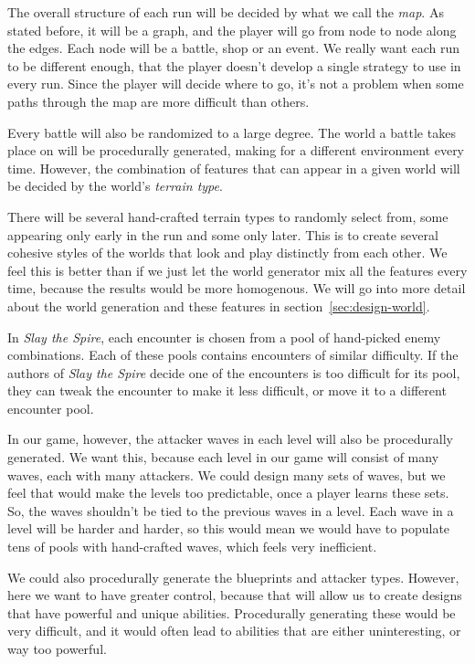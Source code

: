 \begin{notindemo}
    The overall structure of each run will be decided by what we call the \emph{map}.
    As stated before, it will be a graph, and the player will go from node to node along the edges.
    Each node will be a battle, shop or an event.
    We really want each run to be different enough, that the player doesn't develop a single strategy to use in every run.
    Since the player will decide where to go, it's not a problem when some paths through the map are more difficult than others.
\end{notindemo}

Every battle will also be randomized to a large degree.
The world a battle takes place on will be procedurally generated, making for a different environment every time.
However, the combination of features that can appear in a given world will be decided by the world's \emph{terrain type}.
\begin{notindemo}
    There will be several hand-crafted terrain types to randomly select from, some appearing only early in the run and some only later.
    This is to create several cohesive styles of the worlds that look and play distinctly from each other.
    We feel this is better than if we just let the world generator mix all the features every time, because the results would be more homogenous.
    We will go into more detail about the world generation and these features in section~\ref{sec:design-world}.
\end{notindemo}

In \emph{Slay the Spire}, each encounter is chosen from a pool of hand-picked enemy combinations.
Each of these pools contains encounters of similar difficulty.
If the authors of \emph{Slay the Spire} decide one of the encounters is too difficult for its pool, they can tweak the encounter to make it less difficult, or move it to a different encounter pool.

In our game, however, the attacker waves in each level will also be procedurally generated.
We want this, because each level in our game will consist of many waves, each with many attackers.
We could design many sets of waves, but we feel that would make the levels too predictable, once a player learns these sets.
So, the waves shouldn't be tied to the previous waves in a level.
Each wave in a level will be harder and harder, so this would mean we would have to populate tens of pools with hand-crafted waves, which feels very inefficient.

We could also procedurally generate the blueprints and attacker types.
However, here we want to have greater control, because that will allow us to create designs that have powerful and unique abilities.
Procedurally generating these would be very difficult, and it would often lead to abilities that are either uninteresting, or way too powerful.

